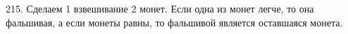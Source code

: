 215. Сделаем 1 взвешивание 2 монет. Если одна из монет легче, то она фальшивая, а если монеты равны, то фальшивой является оставшаяся монета.\\
